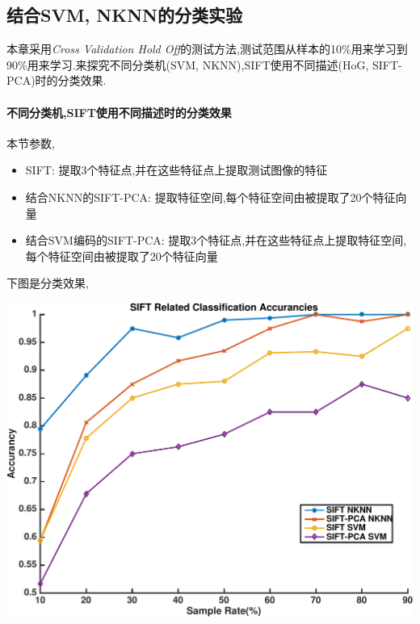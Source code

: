 \subsection{结合SVM, NKNN的分类实验}
本章采用\textit{Cross Validation Hold Off}的测试方法,测试范围从样本的10\%用来学习到90\%用来学习.来探究不同分类机(SVM, NKNN),SIFT使用不同描述(HoG, SIFT-PCA)时的分类效果.\newline

\paragraph{不同分类机,SIFT使用不同描述时的分类效果}
本节参数,\begin{itemize}
	\item SIFT: 提取3个特征点,并在这些特征点上提取测试图像的特征
	\item 结合NKNN的SIFT-PCA: 提取特征空间,每个特征空间由被提取了20个特征向量
	\item 结合SVM编码的SIFT-PCA: 提取3个特征点,并在这些特征点上提取特征空间,每个特征空间由被提取了20个特征向量
\end{itemize}


下图是分类效果,


		\begin{center}
		\begin{minipage}[t]{\linewidth}
		\center
		{
		\includegraphics[width=\MyFactor\textwidth]{Img/c3/sift_classification} 
		}
		\end{minipage}
		\medskip
		\end{center}
		
